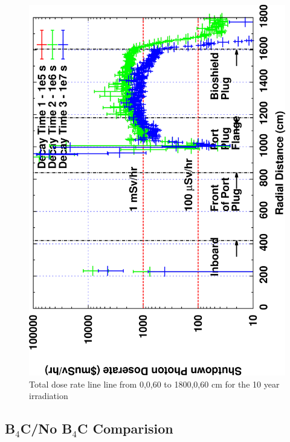 \documentclass[12pt]{article}
\begin{document}
\begin{figure}[ht!]
\centering
\includegraphics[clip,scale=0.12,angle=-90]{../plots/photon_lineout/10yr/no-b4c_10yr.png}
\caption{Total dose rate line line from 0,0,60 to 1800,0,60 cm for the 10 year irradiation}
\label{fig:photons_10y_nob4c_dose}
\end{figure}
\clearpage
{}
\subsection{B$_4$C/No B$_4$C Comparision}
\end{document}
